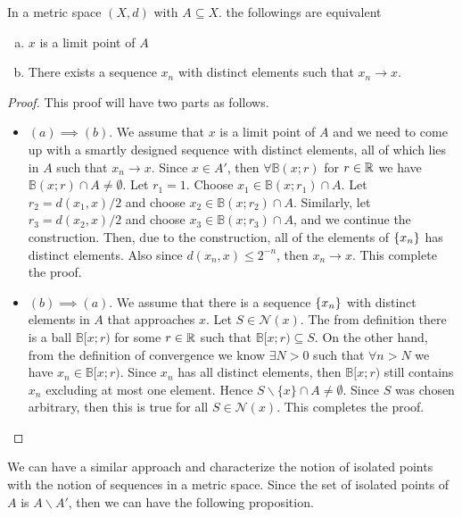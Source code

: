 \begin{proposition}
	\label{sequential}
	In a metric space $(X,d)$ with $A \subseteq X$. the followings are equivalent
	\begin{enumerate}[(a)]
		\item $x$ is a limit point of $A$
		\item There exists a sequence $x_n$ with distinct elements such that $x_n \to x$.
	\end{enumerate}
\end{proposition}
\begin{proof}
	This proof will have two parts as follows.
	\begin{itemize}
		\item $(a) \implies (b)$. We assume that $x$ is a limit point of $A$ and we need to come up with a smartly designed sequence with distinct elements, all of which lies in $A$ such that $x_n \to x$. Since $x \in  A'$, then $\forall \mathbb{B}(x;r)$ for $r\in \mathbb{R}$ we have $\mathbb{B}(x;r) \cap A \neq \emptyset$. Let $r_1 = 1$. Choose $x_1 \in  \mathbb{B}(x;r_1) \cap A$. Let $r_2 = d(x_1,x)/2$ and choose $x_2 \in \mathbb{B}(x;r_2) \cap A$. Similarly, let $r_3 = d(x_2,x)/2$ and choose $x_3 \in \mathbb{B}(x;r_3) \cap A$, and we continue the construction. Then, due to the construction, all of the elements of $\{x_n\}$ has distinct elements. Also since $d(x_n,x)\leq 2^{-n}$, then $x_n \to x$. This complete the proof.
		
		\item $(b) \implies (a)$. We assume that there is a sequence $\{x_n\}$ with distinct elements in $A$ that approaches $x$. Let $S \in \mathcal{N}(x)$. The from definition there is a ball $\mathbb{B}[x;r)$ for some $r\in \mathbb{R}$ such that $\mathbb{B}[x;r) \subseteq S$. On the other hand, from the definition of convergence we know $\exists N>0$ such that $\forall n>N$ we have $x_n \in \mathbb{B}[x;r)$. Since $x_n$ has all distinct elements, then $\mathbb{B}[x;r)$ still contains $x_n$ excluding at most one element. Hence $S\backslash\{x\} \cap A \neq \emptyset$. Since $S$ was chosen arbitrary, then this is true for all $S \in \mathcal{N}(x)$. This completes the proof.
	\end{itemize} 
	
\end{proof}

We can have a similar approach and characterize the notion of isolated points with the notion of sequences in a metric space. Since the set of isolated points of $A$ is $A \backslash A'$, then we can have the following proposition.


